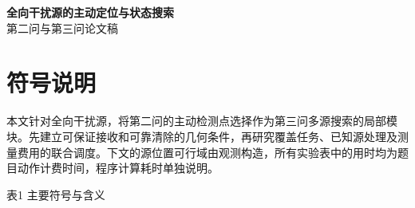 \documentclass[UTF8,zihao=-4,fontset=windows]{ctexart}
\begin{document}
\begin{center}
{\LARGE\bfseries 全向干扰源的主动定位与状态搜索}\\[7pt]
{\large 第二问与第三问论文稿}
\end{center}
\vspace{4pt}
\section{符号说明}\label{ux7b26ux53f7ux8bf4ux660e}

本文针对全向干扰源，将第二问的主动检测点选择作为第三问多源搜索的局部模块。先建立可保证接收和可靠清除的几何条件，再研究覆盖任务、已知源处理及测量费用的联合调度。下文的源位置可行域由观测构造，所有实验表中的用时均为题目动作计费时间，程序计算耗时单独说明。

\Needspace{38mm}
\begin{center}\small 表1 主要符号与含义\end{center}
\nopagebreak
\end{document}

